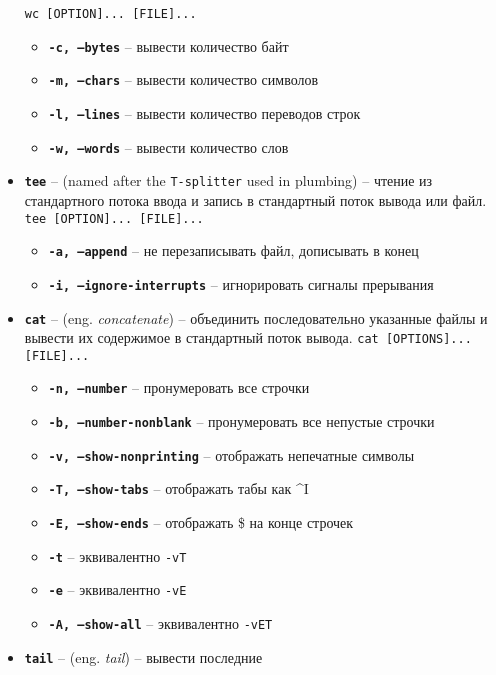 \documentclass[12pt, a4paper]{article}
\begin{document}
\begin{itemize}
    \texttt{wc [OPTION]... [FILE]...}
    \begin{itemize}
      \item \textbf{\texttt{-c, --bytes}} -- вывести количество байт
      \item \textbf{\texttt{-m, --chars}} -- вывести количество символов
      \item \textbf{\texttt{-l, --lines}} -- вывести количество переводов строк
      \item \textbf{\texttt{-w, --words}} -- вывести количество слов
    \end{itemize}
  \item \textbf{\texttt{tee}} -- (named after the \texttt{T-splitter} used in
    plumbing) -- чтение из стандартного потока ввода и запись в стандартный
    поток вывода или файл. \texttt{tee [OPTION]... [FILE]...}
  \begin{itemize}
    \item \textbf{\texttt{-a, --append}} -- не перезаписывать файл, дописывать
      в конец
    \item \textbf{\texttt{-i, --ignore-interrupts}} -- игнорировать сигналы
      прерывания
  \end{itemize}
  \item \textbf{\texttt{cat}} -- (eng. \textit{concatenate}) -- объединить
    последовательно указанные файлы и вывести их содержимое в стандартный
    поток вывода. \texttt{cat [OPTIONS]... [FILE]...}
  \begin{itemize}
    \item \textbf{\texttt{-n, --number}} -- пронумеровать все строчки
    \item \textbf{\texttt{-b, --number-nonblank}} -- пронумеровать все
      непустые строчки
    \item \textbf{\texttt{-v, --show-nonprinting}} -- отображать непечатные
      символы
    \item \textbf{\texttt{-T, --show-tabs}} -- отображать табы как 
      \textasciicircum I
    \item \textbf{\texttt{-E, --show-ends}} -- отображать \$ на конце строчек
    \item \textbf{\texttt{-t}} -- эквивалентно \texttt{-vT}
    \item \textbf{\texttt{-e}} -- эквивалентно \texttt{-vE}
    \item \textbf{\texttt{-A, --show-all}} -- эквивалентно \texttt{-vET}
  \end{itemize}
  \item \textbf{\texttt{tail}} -- (eng. \textit{tail}) -- вывести последние

\end{itemize}
\end{document}

